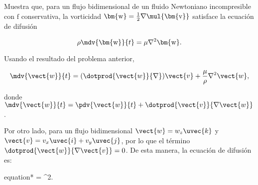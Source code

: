 \documentclass[../main.tex]{subfiles}
\begin{document}
\begin{problema}
	Muestra que, para un flujo bidimensional de un fluido Newtoniano incompresible
	con \(\bm{\mathrm{f}}\) conservativa, la vorticidad
	\(\bm{\mathrm{w}} = \tfrac{1}{2} \nabla \mul{\bm{\mathrm{v}}}\)
	satisface la ecuación de difusión

	\begin{equation*}
		\rho \mdv{\bm{\mathrm{w}}}{t} = \mu \nabla^{2}{\bm{\mathrm{w}}}.
	\end{equation*}

	\startsolution

	Usando el resultado del problema anterior,

	\begin{equation*}
		\mdv{\vect{w}}{t} = (\dotprod{\vect{w}}{\nabla})\vect{v} + \dfrac{\mu}{\rho}\nabla^{2}{\vect{w}},
	\end{equation*}

	donde \(\mdv{\vect{w}}{t} = \pdv{\vect{w}}{t} + \dotprod{\vect{v}}{\nabla{\vect{w}}}\).

	Por otro lado, para un flujo bidimensional \(\vect{w} = w_{z}\uvec{k}\) y
	\(\vect{v} = v_{x}\uvec{i} + v_{y}\uvec{j}\), por lo que el término
	\(\dotprod{\vect{w}}{\nabla{\vect{v}}} = 0\). De esta manera, la ecuación
	de difusión es:

	\begin{empheq}[box = \mainresult]{equation*}
		\rho {} = \mu \nabla^{2}{}.
	\end{empheq}
\end{problema}
\end{document}
